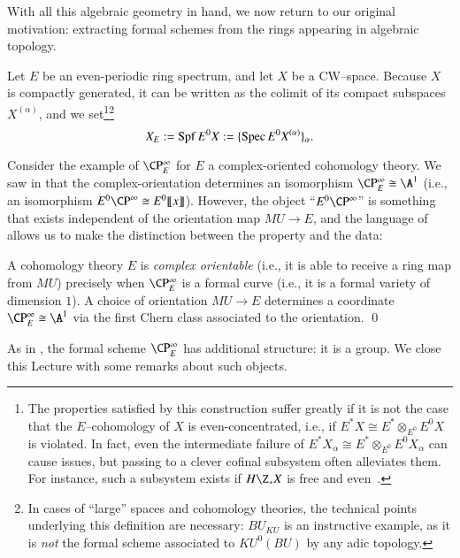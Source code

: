 With all this algebraic geometry in hand, we now return to our original motivation: extracting formal schemes from the rings appearing in algebraic topology.

\begin{definition}\label{FullDefnOfXE}
Let $E$ be an even-periodic ring spectrum, and let $X$ be a CW--space.  Because $X$ is compactly generated, it can be written as the colimit of its compact subspaces $X^{(\alpha)}$, and we set\footnote{The properties satisfied by this construction suffer greatly if it is not the case that the $E$--cohomology of $X$ is even-concentrated, i.e., if $E^* X \cong E^* \otimes_{E^0} E^0 X$ is violated.  In fact, even the intermediate failure of $E^* X_\alpha \cong E^* \otimes_{E^0} E^0 X_\alpha$ can cause issues, but passing to a clever cofinal subsystem often alleviates them.  For instance, such a subsystem exists if $H\Z_* X$ is free and even~\cite[Definition 8.15, Proposition 8.17]{StricklandFSFG}.}\footnote{In cases of ``large'' spaces and cohomology theories, the technical points underlying this definition are necessary: $BU_{KU}$ is an instructive example, as it is \emph{not} the formal scheme associated to $KU^0(BU)$ by any adic topology.} \[X_E := \operatorname{Spf} E^0 X := \{\operatorname{Spec} E^0 X^{(\alpha)}\}_\alpha.\]
\end{definition}

Consider the example of $\CP^\infty_E$ for $E$ a complex-oriented cohomology theory.  We saw in  that the complex-orientation determines an isomorphism $\CP^\infty_E \cong \A^1$ (i.e., an isomorphism $E^0 \CP^\infty \cong E^0\ps{x}$).  However, the object ``$E^0 \CP^\infty$'' is something that exists independent of the orientation map $MU \to E$, and the language of  allows us to make the distinction between the property and the data:
\begin{lemma}
A cohomology theory $E$ is \textit{complex orientable} (i.e., it is able to receive a ring map from $MU$) precisely when $\CP^\infty_E$ is a formal curve (i.e., it is a formal variety of dimension $1$).  A choice of orientation $MU \to E$ determines a coordinate $\CP^\infty_E \cong \A^1$ via the first Chern class associated to the orientation. \qed
\end{lemma}

As in , the formal scheme $\CP^\infty_E$ has additional structure: it is a group.  We close this Lecture with some remarks about such objects.

